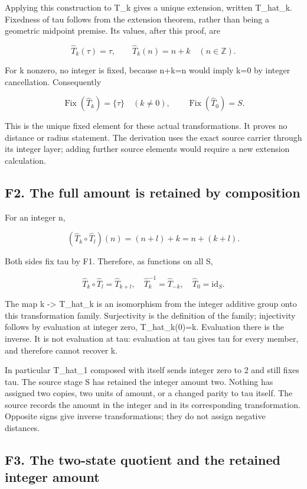 \documentclass[
]{article}
\begin{document}
Applying this construction to T\_k gives a unique extension, written
T\_hat\_k. Fixedness of tau follows from the extension theorem, rather
than being a geometric midpoint premise. Its values, after this proof,
are

\[
\widehat T_k(\tau)=\tau,\qquad
\widehat T_k(n)=n+k\quad(n\in\mathbb Z).
\tag{F1.1}
\]

For k nonzero, no integer is fixed, because n+k=n would imply k=0 by
integer cancellation. Consequently

\[
\operatorname{Fix}(\widehat T_k)=\{\tau\}\quad(k\ne0),
\qquad \operatorname{Fix}(\widehat T_0)=S.
\tag{F1.2}
\]

This is the unique fixed element for these actual transformations. It
proves no distance or radius statement. The derivation uses the exact
source carrier through its integer layer; adding further source elements
would require a new extension calculation.

\subsection{F2. The full amount is retained by
composition}\label{f2.-the-full-amount-is-retained-by-composition}

For an integer n,

\[
(\widehat T_k\circ\widehat T_l)(n)=(n+l)+k=n+(k+l).
\]

Both sides fix tau by F1. Therefore, as functions on all S,

\[
\widehat T_k\circ\widehat T_l=\widehat T_{k+l},\quad
\widehat T_k^{-1}=\widehat T_{-k},\quad
\widehat T_0=\mathrm{id}_S.
\tag{F2.1}
\]

The map k -\textgreater{} T\_hat\_k is an isomorphism from the integer
additive group onto this transformation family. Surjectivity is the
definition of the family; injectivity follows by evaluation at integer
zero, T\_hat\_k(0)=k. Evaluation there is the inverse. It is not
evaluation at tau: evaluation at tau gives tau for every member, and
therefore cannot recover k.

In particular T\_hat\_1 composed with itself sends integer zero to 2 and
still fixes tau. The source stage S has retained the integer amount two.
Nothing has assigned two copies, two units of amount, or a changed
parity to tau itself. The source records the amount in the integer and
in its corresponding transformation. Opposite signs give inverse
transformations; they do not assign negative distances.

\subsection{F3. The two-state quotient and the retained integer
amount}\label{f3.-the-two-state-quotient-and-the-retained-integer-amount}
\end{document}
